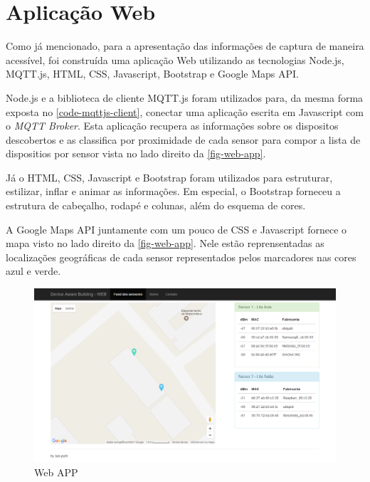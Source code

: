 \section{Aplicação Web}
\label{sec:app-web}

Como já mencionado, para a apresentação das informações de captura de maneira
acessível, foi construída uma aplicação Web utilizando as tecnologias
Node.js, MQTT.js, HTML, CSS, Javascript,
Bootstrap e Google Maps API.

Node.js e a biblioteca de cliente MQTT.js foram utilizados para,
da mesma forma exposta no \autoref{code-mqttjs-client}, conectar
uma aplicação escrita em Javascript com o \emph{MQTT Broker}. Esta
aplicação recupera as informações sobre os dispositos descobertos e as
classifica por proximidade de cada sensor para compor a lista de dispositios
por sensor vista no lado direito da \autoref{fig-web-app}.

Já o HTML, CSS, Javascript e Bootstrap foram
utilizados para estruturar, estilizar, inflar e animar as informações. Em
especial, o Bootstrap forneceu a estrutura de cabeçalho, rodapé e colunas,
além do esquema de cores.

A Google Maps API juntamente com um pouco de CSS e
Javascript fornece o mapa visto no lado direito da \autoref{fig-web-app}.
Nele estão reprensentadas as localizações geográficas de cada sensor
representados pelos marcadores nas cores azul e verde.

\begin{figure}[htb]
	\caption{\label{fig-web-app}Web APP}
	\begin{center}
		\includegraphics[width=1\textwidth]{053-web/web-app.png}
	\end{center}
\end{figure}
